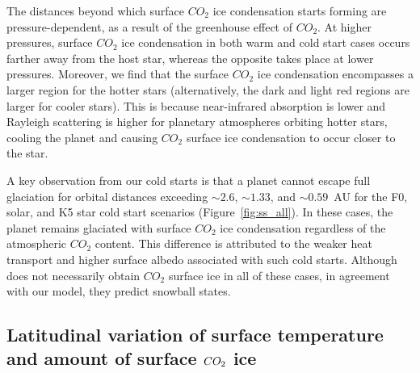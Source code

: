 \documentclass[fleqn,usenatbib]{mnras}
\begin{document}
The distances beyond which surface $CO_{\mathrm{2}}$ ice condensation starts forming are pressure-dependent, as a result of the greenhouse effect of $CO_{\mathrm{2}}$. At higher pressures, surface $CO_{\mathrm{2}}$ ice condensation in both warm and cold start cases occurs farther away from the host star, whereas the opposite takes place at lower pressures. Moreover, we find that the surface $CO_{\mathrm{2}}$ ice condensation encompasses a larger region for the hotter stars (alternatively, the dark and light red regions are larger for cooler stars). This is because near-infrared absorption is lower and Rayleigh scattering is higher for planetary atmospheres orbiting hotter stars, cooling the planet and causing $CO_{\mathrm{2}}$ surface ice condensation to occur closer to the star.

A key observation from our cold starts is that a planet cannot escape full glaciation for orbital distances exceeding $\sim 2.6$, $\sim1.33$, and $\sim0.59$~AU for the F0, solar, and K5 star cold start scenarios (Figure~\ref{fig:ss_all}). In these cases, the planet remains glaciated with surface $CO_{\mathrm{2}}$ ice condensation regardless of the atmospheric $CO_{\mathrm{2}}$ content. This difference is attributed to the weaker heat transport and higher surface albedo associated with such cold starts. Although \citet{Turbet2017} does not necessarily obtain $CO_{\mathrm{2}}$ surface ice in all of these cases, in agreement with our model, they predict snowball states. 

\subsection{Latitudinal variation of surface temperature and amount of surface $CO_{\rm 2}$ ice}
\label{sec:surf_temp}
\end{document}
